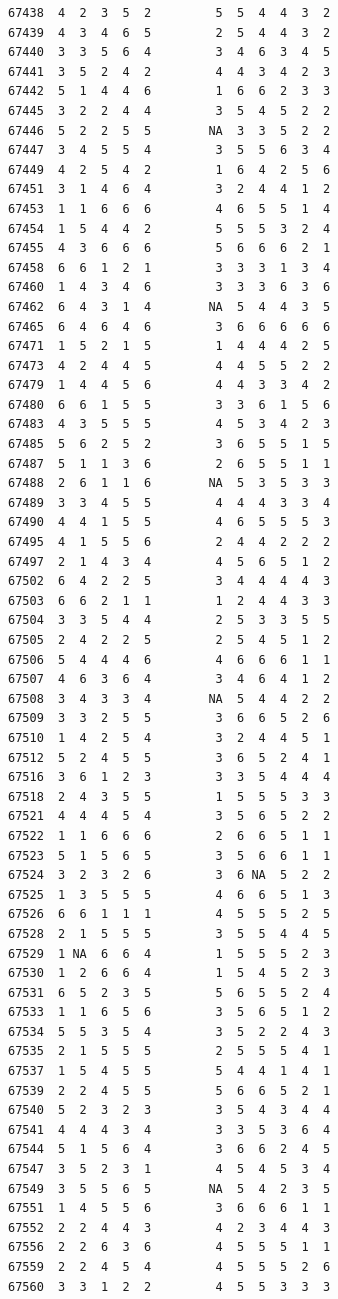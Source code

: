 \documentclass[
  letterpaper,
  DIV=11,
  numbers=noendperiod]{scrreprt}
\begin{document}
\begin{verbatim}
67438  4  2  3  5  2         5  5  4  4  3  2
67439  4  3  4  6  5         2  5  4  4  3  2
67440  3  3  5  6  4         3  4  6  3  4  5
67441  3  5  2  4  2         4  4  3  4  2  3
67442  5  1  4  4  6         1  6  6  2  3  3
67445  3  2  2  4  4         3  5  4  5  2  2
67446  5  2  2  5  5        NA  3  3  5  2  2
67447  3  4  5  5  4         3  5  5  6  3  4
67449  4  2  5  4  2         1  6  4  2  5  6
67451  3  1  4  6  4         3  2  4  4  1  2
67453  1  1  6  6  6         4  6  5  5  1  4
67454  1  5  4  4  2         5  5  5  3  2  4
67455  4  3  6  6  6         5  6  6  6  2  1
67458  6  6  1  2  1         3  3  3  1  3  4
67460  1  4  3  4  6         3  3  3  6  3  6
67462  6  4  3  1  4        NA  5  4  4  3  5
67465  6  4  6  4  6         3  6  6  6  6  6
67471  1  5  2  1  5         1  4  4  4  2  5
67473  4  2  4  4  5         4  4  5  5  2  2
67479  1  4  4  5  6         4  4  3  3  4  2
67480  6  6  1  5  5         3  3  6  1  5  6
67483  4  3  5  5  5         4  5  3  4  2  3
67485  5  6  2  5  2         3  6  5  5  1  5
67487  5  1  1  3  6         2  6  5  5  1  1
67488  2  6  1  1  6        NA  5  3  5  3  3
67489  3  3  4  5  5         4  4  4  3  3  4
67490  4  4  1  5  5         4  6  5  5  5  3
67495  4  1  5  5  6         2  4  4  2  2  2
67497  2  1  4  3  4         4  5  6  5  1  2
67502  6  4  2  2  5         3  4  4  4  4  3
67503  6  6  2  1  1         1  2  4  4  3  3
67504  3  3  5  4  4         2  5  3  3  5  5
67505  2  4  2  2  5         2  5  4  5  1  2
67506  5  4  4  4  6         4  6  6  6  1  1
67507  4  6  3  6  4         3  4  6  4  1  2
67508  3  4  3  3  4        NA  5  4  4  2  2
67509  3  3  2  5  5         3  6  6  5  2  6
67510  1  4  2  5  4         3  2  4  4  5  1
67512  5  2  4  5  5         3  6  5  2  4  1
67516  3  6  1  2  3         3  3  5  4  4  4
67518  2  4  3  5  5         1  5  5  5  3  3
67521  4  4  4  5  4         3  5  6  5  2  2
67522  1  1  6  6  6         2  6  6  5  1  1
67523  5  1  5  6  5         3  5  6  6  1  1
67524  3  2  3  2  6         3  6 NA  5  2  2
67525  1  3  5  5  5         4  6  6  5  1  3
67526  6  6  1  1  1         4  5  5  5  2  5
67528  2  1  5  5  5         3  5  5  4  4  5
67529  1 NA  6  6  4         1  5  5  5  2  3
67530  1  2  6  6  4         1  5  4  5  2  3
67531  6  5  2  3  5         5  6  5  5  2  4
67533  1  1  6  5  6         3  5  6  5  1  2
67534  5  5  3  5  4         3  5  2  2  4  3
67535  2  1  5  5  5         2  5  5  5  4  1
67537  1  5  4  5  5         5  4  4  1  4  1
67539  2  2  4  5  5         5  6  6  5  2  1
67540  5  2  3  2  3         3  5  4  3  4  4
67541  4  4  4  3  4         3  3  5  3  6  4
67544  5  1  5  6  4         3  6  6  2  4  5
67547  3  5  2  3  1         4  5  4  5  3  4
67549  3  5  5  6  5        NA  5  4  2  3  5
67551  1  4  5  5  6         3  6  6  6  1  1
67552  2  2  4  4  3         4  2  3  4  4  3
67556  2  2  6  3  6         4  5  5  5  1  1
67559  2  2  4  5  4         4  5  5  5  2  6
67560  3  3  1  2  2         4  5  5  3  3  3
\end{verbatim}
\end{document}
